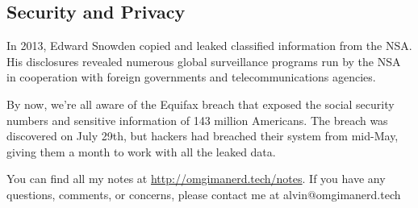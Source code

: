 \documentclass{math}
\begin{document}
\subsection*{Security and Privacy}
In 2013, Edward Snowden copied and leaked classified information from the NSA.
His disclosures revealed numerous global surveillance programs run by the NSA in
cooperation with foreign governments and telecommunications agencies. \par
By now, we're all aware of the Equifax breach that exposed the social security
numbers and sensitive information of 143 million Americans. The breach was
discovered on July 29th, but hackers had breached their system from mid-May,
giving them a month to work with all the leaked data.

\begin{center}
  You can find all my notes at \url{http://omgimanerd.tech/notes}. If you have
  any questions, comments, or concerns, please contact me at
  alvin@omgimanerd.tech
\end{center}
\end{document}
